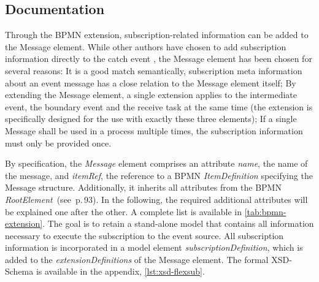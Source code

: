 \subsection{Documentation}

Through the BPMN extension, subscription-related information can be added to the Message element.
While other authors have chosen to add subscription information directly to the catch event \cite{Baumgrass2016,beyer2016unicorn}, the Message element has been chosen for several reasons: It is a good match semantically, subscription meta information about an event message has a close relation to the Message element itself; By extending the Message element, a single extension applies to the intermediate event, the boundary event and the receive task at the same time (the extension is specifically designed for the use with exactly these three elements); If a single Message shall be used in a process multiple times, the subscription information must only be provided once.

By specification, the \textit{Message} element comprises an attribute \textit{name}, the name of the message, and \textit{itemRef}, the reference to a BPMN \textit{ItemDefinition} specifying the Message structure. Additionally, it inherits all attributes from the BPMN \textit{RootElement}~(see \cite{bpmnspec}\,p.\,93).
In the following, the required additional attributes will be explained one after the other. A complete list is available in \autoref{tab:bpmn-extension}. The goal is to retain a stand-alone model that contains all information necessary to execute the subscription to the event source.
All subscription information is incorporated in a model element \textit{subscriptionDefinition}, which is added to the \textit{extensionDefinitions} of the Message element.
The formal XSD-Schema is available in the appendix, \autoref{lst:xsd-flexsub}.

